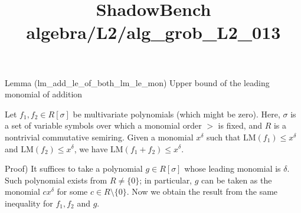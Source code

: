 \documentclass{article}
\title{ShadowBench algebra/L2/alg\_grob\_L2\_013}
\begin{document}
\maketitle

Lemma (lm_add_le_of_both_lm_le_mon)
Upper bound of the leading monomial of addition

Let $f_1, f_2 \in R[\sigma]$ be multivariate polynomials (which might be zero). Here, $\sigma$ is a set of variable symbols over which a monomial order $>$ is fixed, and $R$ is a nontrivial commutative semiring. Given a monomial $x^\delta$ such that $\mathrm{LM}(f_1) \le x^\delta$ and $\mathrm{LM}(f_2) \le x^\delta$, we have $\mathrm{LM}(f_1 + f_2) \le x^\delta$.

Proof)
It suffices to take a polynomial $g \in R[\sigma]$ whose leading monomial is $\delta$. Such polynomial exists from $R \ne \{0\}$; in particular, $g$ can be taken as the monomial $cx^\delta$ for some $c \in R \setminus \{0\}$. Now we obtain the result from the same inequality for $f_1, f_2$ and $g$.
\end{document}
